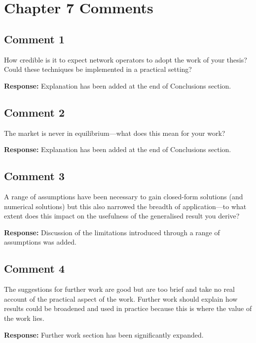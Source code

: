 \documentclass[10pt,a4paper,notitlepage]{article}
\numberwithin{equation}{section}
\begin{document}
\clearpage

\section{Chapter 7 Comments}
\subsection{Comment 1}
How credible is it to expect network operators to adopt the work of your thesis? Could these techniques be implemented in a practical setting?

\textbf{Response:}
Explanation has been added at the end of Conclusions section.

\subsection{Comment 2}
The market is never in equilibrium---what does this mean for your work?

\textbf{Response:}
Explanation has been added at the end of Conclusions section.

\subsection{Comment 3}
A range of assumptions have been necessary to gain closed-form solutions (and numerical solutions) but this also narrowed the breadth of application---to what extent does this impact on the usefulness of the generalised result you derive?

\textbf{Response:}
Discussion of the limitations introduced through a range of assumptions was added.

\subsection{Comment 4}
The suggestions for further work are good but are too brief and take no real account of the practical aspect of the work. Further work should explain how results could be broadened and used in practice because this is where the value of the work lies.

\textbf{Response:}
Further work section has been significantly expanded.
\end{document}
